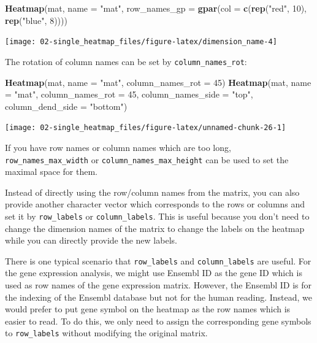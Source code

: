 \documentclass[]{book}
\newenvironment{Shaded}{\begin{snugshade}}{\end{snugshade}}
\newcommand{\KeywordTok}[1]{\textcolor[rgb]{0.13,0.29,0.53}{\textbf{#1}}}
\newcommand{\DataTypeTok}[1]{\textcolor[rgb]{0.13,0.29,0.53}{#1}}
\newcommand{\DecValTok}[1]{\textcolor[rgb]{0.00,0.00,0.81}{#1}}
\newcommand{\StringTok}[1]{\textcolor[rgb]{0.31,0.60,0.02}{#1}}
\newcommand{\NormalTok}[1]{#1}
\theoremstyle{definition}
\theoremstyle{definition}
\theoremstyle{definition}
\theoremstyle{remark}
\begin{document}
\begin{Shaded}
\begin{Highlighting}[]
\KeywordTok{Heatmap}\NormalTok{(mat, }\DataTypeTok{name =} \StringTok{"mat"}\NormalTok{, }\DataTypeTok{row_names_gp =} \KeywordTok{gpar}\NormalTok{(}\DataTypeTok{col =} \KeywordTok{c}\NormalTok{(}\KeywordTok{rep}\NormalTok{(}\StringTok{"red"}\NormalTok{, }\DecValTok{10}\NormalTok{), }\KeywordTok{rep}\NormalTok{(}\StringTok{"blue"}\NormalTok{, }\DecValTok{8}\NormalTok{))))}
\end{Highlighting}
\end{Shaded}

\begin{center}\texttt{[image: 02-single\_heatmap\_files/figure-latex/dimension\_name-4]} \end{center}

The rotation of column names can be set by \texttt{column\_names\_rot}:

\begin{Shaded}
\begin{Highlighting}[]
\KeywordTok{Heatmap}\NormalTok{(mat, }\DataTypeTok{name =} \StringTok{"mat"}\NormalTok{, }\DataTypeTok{column_names_rot =} \DecValTok{45}\NormalTok{)}
\KeywordTok{Heatmap}\NormalTok{(mat, }\DataTypeTok{name =} \StringTok{"mat"}\NormalTok{, }\DataTypeTok{column_names_rot =} \DecValTok{45}\NormalTok{, }\DataTypeTok{column_names_side =} \StringTok{"top"}\NormalTok{,}
    \DataTypeTok{column_dend_side =} \StringTok{"bottom"}\NormalTok{)}
\end{Highlighting}
\end{Shaded}

\begin{center}\texttt{[image: 02-single\_heatmap\_files/figure-latex/unnamed-chunk-26-1]} \end{center}

If you have row names or column names which are too long,
\texttt{row\_names\_max\_width} or \texttt{column\_names\_max\_height}
can be used to set the maximal space for them.

Instead of directly using the row/column names from the matrix, you can
also provide another character vector which corresponds to the rows or
columns and set it by \texttt{row\_labels} or \texttt{column\_labels}.
This is useful because you don't need to change the dimension names of
the matrix to change the labels on the heatmap while you can directly
provide the new labels.

There is one typical scenario that \texttt{row\_labels} and
\texttt{column\_labels} are useful. For the gene expression analysis, we
might use Ensembl ID as the gene ID which is used as row names of the
gene expression matrix. However, the Ensembl ID is for the indexing of
the Ensembl database but not for the human reading. Instead, we would
prefer to put gene symbol on the heatmap as the row names which is
easier to read. To do this, we only need to assign the corresponding
gene symbols to \texttt{row\_labels} without modifying the original
matrix.
\end{document}
